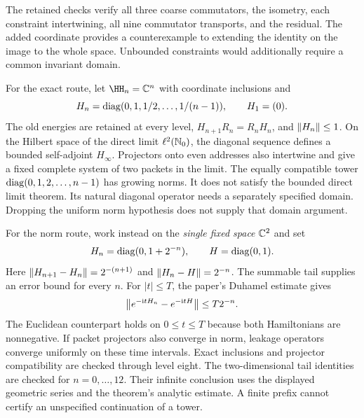 The retained checks verify all three coarse commutators, the isometry, each constraint intertwining, all nine commutator transports, and the residual. The added coordinate provides a counterexample to extending the identity on the image to the whole space. Unbounded constraints would additionally require a common invariant domain.

For the exact route, let $\HH_n=\CC^n$ with coordinate inclusions and
\[
H_n=\operatorname{diag}(0,1,1/2,\ldots,1/(n-1)),\qquad H_1=(0).
\]
The old energies are retained at every level, $H_{n+1}R_n=R_nH_n$, and $\left\lVert H_n\right\rVert\leq1$. On the Hilbert space of the direct limit $\ell^2(\NN_0)$, the diagonal sequence defines a bounded self-adjoint $H_\infty$. Projectors onto even addresses also intertwine and give a fixed complete system of two packets in the limit.
The equally compatible tower $\operatorname{diag}(0,1,2,\ldots,n-1)$ has growing norms. It does not satisfy the bounded direct limit theorem. Its natural diagonal operator needs a separately specified domain. Dropping the uniform norm hypothesis does not supply that domain argument.

For the norm route, work instead on the \emph{single fixed space} $\CC^2$ and set
\[
H_n=\operatorname{diag}(0,1+2^{-n}),\qquad H=\operatorname{diag}(0,1).
\]
Here $\left\lVert H_{n+1}-H_n\right\rVert=2^{-(n+1)}$ and $\left\lVert H_n-H\right\rVert=2^{-n}$. The summable tail supplies an error bound for every $n$. For $|t|\leq T$, the paper's Duhamel estimate gives
\[
\norm{e^{-\ii tH_n}-e^{-\ii tH}}\leq T2^{-n}.
\]
The Euclidean counterpart holds on $0\leq t\leq T$ because both Hamiltonians are nonnegative. If packet projectors also converge in norm, leakage operators converge uniformly on these time intervals.
Exact inclusions and projector compatibility are checked through level eight. The two-dimensional tail identities are checked for $n=0,\ldots,12$. Their infinite conclusion uses the displayed geometric series and the theorem's analytic estimate. A finite prefix cannot certify an unspecified continuation of a tower.


